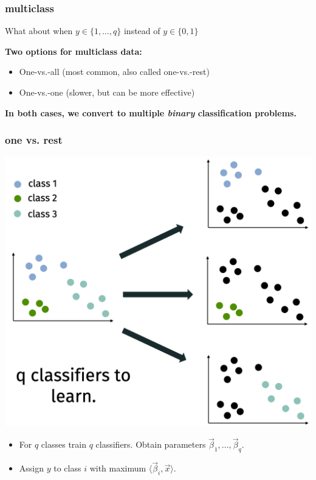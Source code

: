 \documentclass[handout,compress]{beamer}
\begin{document}
\begin{frame}
	\frametitle{multiclass}
	\begin{center}
		What about when $y \in \{1,\ldots, q\}$ instead of $y\in \{0,1\}$
	\end{center}
	\textbf{Two options for multiclass data:}
	\begin{itemize}
		\item One-vs.-all (most common, also called one-vs.-rest)
		\item One-vs.-one (slower, but can be more effective)
	\end{itemize}
	\begin{center}
		\textbf{In both cases, we convert to multiple \emph{binary} classification problems.}
	\end{center}
\end{frame}

\begin{frame}
	\frametitle{one vs. rest}
	\small
	\begin{center}
		\includegraphics[width=.6\textwidth]{one_vs_all.png}
	\end{center}
	\vspace{-1em}
	\begin{itemize}
		\item For $q$ classes train $q$ classifiers. Obtain parameters $\vec{\beta}_1, \ldots, \vec{\beta}_q$.
		\item Assign $y$ to class $i$ with maximum $\langle\vec{\beta}_i,\vec{x}\rangle$.
	\end{itemize}
\end{frame}
\end{document}
